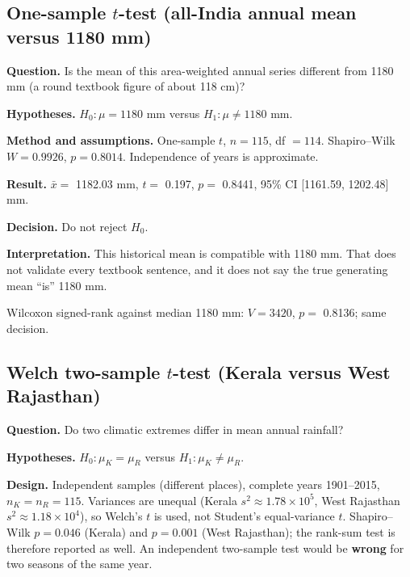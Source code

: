 \documentclass[
]{article}
\begin{document}
\subsection{\texorpdfstring{One-sample \(t\)-test (all-India annual mean
versus 1180
mm)}{One-sample t-test (all-India annual mean versus 1180 mm)}}\label{one-sample-t-test-all-india-annual-mean-versus-1180-mm}

\textbf{Question.} Is the mean of this area-weighted annual series
different from 1180 mm (a round textbook figure of about 118 cm)?

\textbf{Hypotheses.} \(H_0:\mu=1180\) mm versus \(H_1:\mu\neq 1180\) mm.

\textbf{Method and assumptions.} One-sample \(t\), \(n=115\), df
\(=114\). Shapiro--Wilk \(W=0.9926\), \(p=0.8014\). Independence of
years is approximate.

\textbf{Result.} \(\bar x=\) 1182.03 mm, \(t=\) 0.197, \(p=\) 0.8441,
95\% CI {[}1161.59, 1202.48{]} mm.

\textbf{Decision.} Do not reject \(H_0\).

\textbf{Interpretation.} This historical mean is compatible with 1180
mm. That does not validate every textbook sentence, and it does not say
the true generating mean ``is'' 1180 mm.

Wilcoxon signed-rank against median 1180 mm: \(V=3420\), \(p=\) 0.8136;
same decision.

\subsection{\texorpdfstring{Welch two-sample \(t\)-test (Kerala versus
West
Rajasthan)}{Welch two-sample t-test (Kerala versus West Rajasthan)}}\label{welch-two-sample-t-test-kerala-versus-west-rajasthan}

\textbf{Question.} Do two climatic extremes differ in mean annual
rainfall?

\textbf{Hypotheses.} \(H_0:\mu_K=\mu_R\) versus \(H_1:\mu_K\neq\mu_R\).

\textbf{Design.} Independent samples (different places), complete years
1901--2015, \(n_K=n_R=115\). Variances are unequal (Kerala
\(s^2\approx 1.78\times 10^5\), West Rajasthan
\(s^2\approx 1.18\times 10^4\)), so Welch's \(t\) is used, not Student's
equal-variance \(t\). Shapiro--Wilk \(p=0.046\) (Kerala) and \(p=0.001\)
(West Rajasthan); the rank-sum test is therefore reported as well. An
independent two-sample test would be \textbf{wrong} for two seasons of
the same year.
\end{document}
